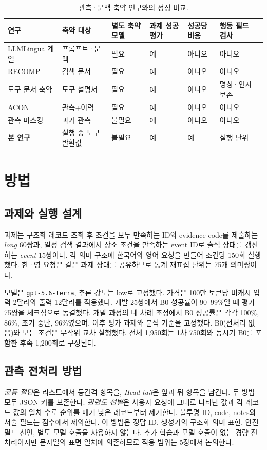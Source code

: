 \documentclass[10pt,twocolumn]{article}
\begin{document}
\begin{table}[t]
\centering
\caption{관측·문맥 축약 연구와의 정성 비교.}
\label{tab:related}
\small
\begin{tabular}{@{}lllllll@{}}
\toprule
연구 & 축약 대상 & 별도 축약 모델 & 과제 성공 평가 & 성공당 비용 & 행동 필드 검사 \\
\midrule
LLMLingua 계열\cite{jiang2023llmlingua,jiang2024longllmlingua,pan2024llmlingua2}
& 프롬프트·문맥 & 필요 & 예 & 아니오 & 아니오 \\
RECOMP\cite{xu2024recomp} & 검색 문서 & 필요 & 예 & 아니오 & 아니오 \\
도구 문서 축약\cite{xu2024toolcompression} & 도구 설명서 & 필요 & 예 & 아니오 & 명칭·인자 보존 \\
ACON\cite{kang2025acon} & 관측+이력 & 필요 & 예 & 아니오 & 아니오 \\
관측 마스킹\cite{lindenbauer2025complexity} & 과거 관측 & 불필요 & 예 & 아니오 & 아니오 \\
\textbf{본 연구} & 실행 중 도구 반환값 & 불필요 & 예 & 예 & 실행 단위 \\
\bottomrule
\end{tabular}
\end{table}

\section{방법}
\subsection{과제와 실행 설계}
과제는 구조화 레코드 조회 후 조건을 모두 만족하는 ID와 evidence code를
제출하는 \textit{long} 60쌍과, 일정 검색 결과에서 장소 조건을 만족하는 event
ID로 출석 상태를 갱신하는 \textit{event} 15쌍이다. 각 의미 구조에 한국어와
영어 요청을 만들어 조건당 150회 실행했다. 한·영 요청은 같은 과제 상태를
공유하므로 통계 재표집 단위는 75개 의미쌍이다.

모델은 \texttt{gpt-5.6-terra}, 추론 강도는 low로 고정했다. 가격은
100만 토큰당 비캐시 입력 2달러와 출력 12달러를 적용했다. 개발 25쌍에서
B0 성공률이 90--99\%일 때 평가 75쌍을 체크섬으로 동결했다. 개발 과정의
네 차례 조정에서 B0 성공률은 각각 100\%, 86\%, 조기 중단, 96\%였으며,
이후 평가 과제와 분석 기준을 고정했다. B0(전처리 없음)와 모든 조건은 무작위
교차 실행했다. 전체 1,950회는 1차 750회와 동시기 B0를 포함한 후속 1,200회로
구성된다.

\subsection{관측 전처리 방법}
\textit{균등 절단}은 리스트에서 등간격 항목을, \textit{Head-tail}은 앞과 뒤
항목을 남긴다. 두 방법 모두 JSON 키를 보존한다. \textit{관련도 선별}은 사용자
요청에 그대로 나타난 값과 각 레코드 값의
일치 수로 순위를 매겨 낮은 레코드부터 제거한다. 불투명 ID, code, notes와
서술 필드는 점수에서 제외한다. 이 방법은 정답 ID, 생성기의 구조화 의미 표현,
안전 필드 선언, 별도 모델 호출을 사용하지 않는다. 추가 학습과 모델 호출이 없는
경량 전처리이지만 문자열의 표면 일치에 의존하므로 적용 범위는 5장에서 논의한다.
\end{document}
